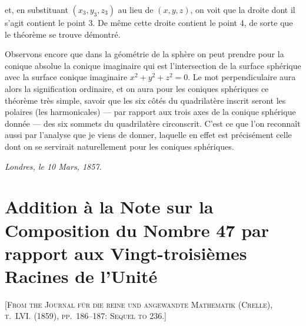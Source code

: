 \documentclass[11pt,a4paper]{article}
\begin{document}
\setcounter{page}{77}

et, en substituant $(x_3, y_3, z_3)$ au lieu de $(x, y, z)$, on voit que la droite dont il s'agit contient le point 3. De même cette droite contient le point 4, de sorte que le théorème se trouve démontré.

Observons encore que dans la géométrie de la sphère on peut prendre pour la conique absolue la conique imaginaire qui est l'intersection de la surface sphérique avec la surface conique imaginaire $x^2 + y^2 + z^2 = 0$. Le mot perpendiculaire aura alors la signification ordinaire, et on aura pour les coniques sphériques ce théorème très simple, savoir que les six côtés du quadrilatère inscrit seront les polaires (les harmonicales) --- par rapport aux trois axes de la conique sphérique donnée --- des six sommets du quadrilatère circonscrit. C'est ce que l'on reconnaît aussi par l'analyse que je viens de donner, laquelle en effet est précisément celle dont on se servirait naturellement pour les coniques sphériques.

\medskip
\noindent\textit{Londres, le 10 Mars, 1857.}


\newpage


\section{Addition à la Note sur la Composition du Nombre 47 par rapport aux Vingt-troisièmes Racines de l'Unité}
\label{paper:239}

\textsc{[From the Journal für die reine und angewandte Mathematik (Crelle), t.~LVI. (1859), pp.~186--187: Sequel to 236.]}

\setcounter{page}{78}

\end{document}
